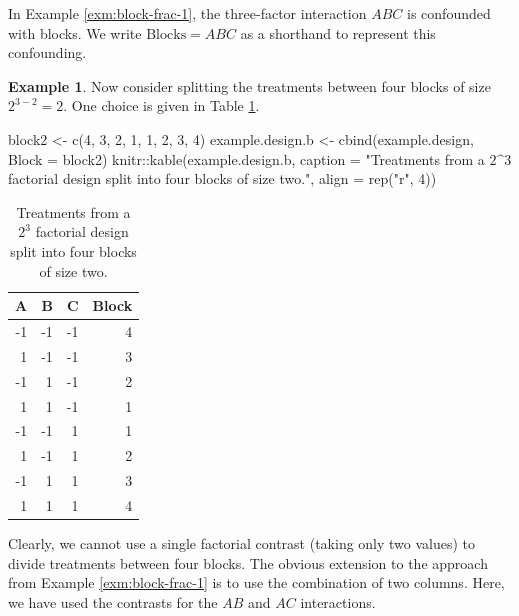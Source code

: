 \documentclass[
]{book}
\newenvironment{Shaded}{\begin{snugshade}}{\end{snugshade}}
\newcommand{\AttributeTok}[1]{\textcolor[rgb]{0.77,0.63,0.00}{#1}}
\newcommand{\DecValTok}[1]{\textcolor[rgb]{0.00,0.00,0.81}{#1}}
\newcommand{\FunctionTok}[1]{\textcolor[rgb]{0.00,0.00,0.00}{#1}}
\newcommand{\NormalTok}[1]{#1}
\newcommand{\OtherTok}[1]{\textcolor[rgb]{0.56,0.35,0.01}{#1}}
\newcommand{\SpecialCharTok}[1]{\textcolor[rgb]{0.00,0.00,0.00}{#1}}
\newcommand{\StringTok}[1]{\textcolor[rgb]{0.31,0.60,0.02}{#1}}
\theoremstyle{definition}
\theoremstyle{definition}
\newtheorem{example}{Example}[chapter]
\theoremstyle{definition}
\theoremstyle{definition}
\theoremstyle{remark}
\begin{document}
In Example \ref{exm:block-frac-1}, the three-factor interaction \(ABC\) is confounded with blocks. We write \(\mathrm{Blocks} = ABC\) as a shorthand to represent this confounding.

\begin{example}
\protect\hypertarget{exm:block-frac-2}{}\label{exm:block-frac-2}Now consider splitting the treatments between four blocks of size \(2^{3-2}=2\). One choice is given in Table \ref{tab:block-frac-2}.

\begin{Shaded}
\begin{Highlighting}[]
\NormalTok{block2 }\OtherTok{\textless{}{-}} \FunctionTok{c}\NormalTok{(}\DecValTok{4}\NormalTok{, }\DecValTok{3}\NormalTok{, }\DecValTok{2}\NormalTok{, }\DecValTok{1}\NormalTok{, }\DecValTok{1}\NormalTok{, }\DecValTok{2}\NormalTok{, }\DecValTok{3}\NormalTok{, }\DecValTok{4}\NormalTok{)}
\NormalTok{example.design.b }\OtherTok{\textless{}{-}} \FunctionTok{cbind}\NormalTok{(example.design, }\AttributeTok{Block =}\NormalTok{ block2)}
\NormalTok{knitr}\SpecialCharTok{::}\FunctionTok{kable}\NormalTok{(example.design.b, }\AttributeTok{caption =} \StringTok{"Treatments from a $2\^{}3$ factorial design split into four blocks of size two."}\NormalTok{, }\AttributeTok{align =} \FunctionTok{rep}\NormalTok{(}\StringTok{"r"}\NormalTok{, }\DecValTok{4}\NormalTok{))}
\end{Highlighting}
\end{Shaded}

\begin{table}

\caption{\label{tab:block-frac-2}Treatments from a $2^3$ factorial design split into four blocks of size two.}
\centering
\begin{tabular}[t]{r|r|r|r}
\hline
A & B & C & Block\\
\hline
-1 & -1 & -1 & 4\\
\hline
1 & -1 & -1 & 3\\
\hline
-1 & 1 & -1 & 2\\
\hline
1 & 1 & -1 & 1\\
\hline
-1 & -1 & 1 & 1\\
\hline
1 & -1 & 1 & 2\\
\hline
-1 & 1 & 1 & 3\\
\hline
1 & 1 & 1 & 4\\
\hline
\end{tabular}
\end{table}

Clearly, we cannot use a single factorial contrast (taking only two values) to divide treatments between four blocks. The obvious extension to the approach from Example \ref{exm:block-frac-1} is to use the combination of two columns. Here, we have used the contrasts for the \(AB\) and \(AC\) interactions.


\end{example}
\end{document}
